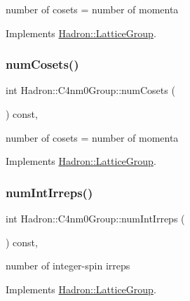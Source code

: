 number of cosets = number of momenta 

Implements \mbox{\hyperlink{structHadron_1_1LatticeGroup_afc76430f36a3a041f86d4058c59bf55e}{Hadron\+::\+Lattice\+Group}}.

\mbox{\label{structHadron_1_1C4nm0Group_ad38f333075aa53f1b0c7bded9f7e70ad}} 
\subsubsection{\texorpdfstring{numCosets()}{numCosets()}\hspace{0.1cm}{\footnotesize\ttfamily [3/3]}}
{\footnotesize\ttfamily int Hadron\+::\+C4nm0\+Group\+::num\+Cosets (\begin{DoxyParamCaption}{ }\end{DoxyParamCaption}) const\hspace{0.3cm}{\ttfamily [inline]}, {\ttfamily [virtual]}}

number of cosets = number of momenta 

Implements \mbox{\hyperlink{structHadron_1_1LatticeGroup_afc76430f36a3a041f86d4058c59bf55e}{Hadron\+::\+Lattice\+Group}}.

\mbox{\label{structHadron_1_1C4nm0Group_aefbae18f6b66563a061d607e680fcab7}} 
\subsubsection{\texorpdfstring{numIntIrreps()}{numIntIrreps()}\hspace{0.1cm}{\footnotesize\ttfamily [1/3]}}
{\footnotesize\ttfamily int Hadron\+::\+C4nm0\+Group\+::num\+Int\+Irreps (\begin{DoxyParamCaption}{ }\end{DoxyParamCaption}) const\hspace{0.3cm}{\ttfamily [inline]}, {\ttfamily [virtual]}}

number of integer-\/spin irreps 

Implements \mbox{\hyperlink{structHadron_1_1LatticeGroup_af2aa7b39222bf188389356eefcef7547}{Hadron\+::\+Lattice\+Group}}.

